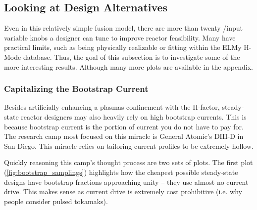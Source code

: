 \subsection{Looking at Design Alternatives}

Even in this relatively simple fusion model, there are more than twenty /input variable knobs a designer can tune to improve reactor feasibility. Many have practical limits, such as being physically realizable or fitting within the ELMy H-Mode database. Thus, the goal of this subsection is to investigate some of the more interesting results. Although many more plots are available in the appendix.

\subsubsection{Capitalizing the Bootstrap Current}

Besides artificially enhancing a plasmas confinement with the H-factor, steady-state reactor designers may also heavily rely on high bootstrap currents. This is because bootstrap current is the portion of current you do not have to pay for. The research camp most focused on this miracle is General Atomic's DIII-D in San Diego. This miracle relies on tailoring current profiles to be extremely hollow.

Quickly reasoning this camp's thought process are two sets of plots. The first plot (\cref{fig:bootstrap_samplings}) highlights how the cheapest possible steady-state designs have bootstrap fractions approaching unity -- they use almost no current drive. This makes sense as current drive is extremely cost prohibitive (i.e. why people consider pulsed tokamaks).

